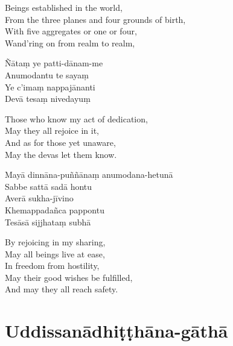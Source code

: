 \begin{english}
  Beings established in the world,\\
  From the three planes and four grounds of birth,\\
  With five aggregates or one or four,\\
  Wand'ring on from realm to realm,
\end{english}

Ñātaṃ ye patti-dānam-me\\
Anumodantu te sayaṃ\\
Ye c'imaṃ nappajānanti\\
Devā tesaṃ nivedayuṃ

\enlargethispage{\baselineskip}

\begin{english}
  Those who know my act of dedication,\\
  May they all rejoice in it,\\
  And as for those yet unaware,\\
  May the devas let them know.
\end{english}

Mayā dinnāna-puññānaṃ anumodana-hetunā\\
Sabbe sattā sadā hontu\\
Averā sukha-jīvino\\
Khemappadañca pappontu\\
Tesāsā sijjhataṃ subhā

\begin{english}
  By rejoicing in my sharing,\\
  May all beings live at ease,\\
  In freedom from hostility,\\
  May their good wishes be fulfilled,\\
  And may they all reach safety.
\end{english}

\section{Uddissanādhiṭṭhāna-gāthā}

\enlargethispage{\baselineskip}

\begin{leader}
\end{leader}


